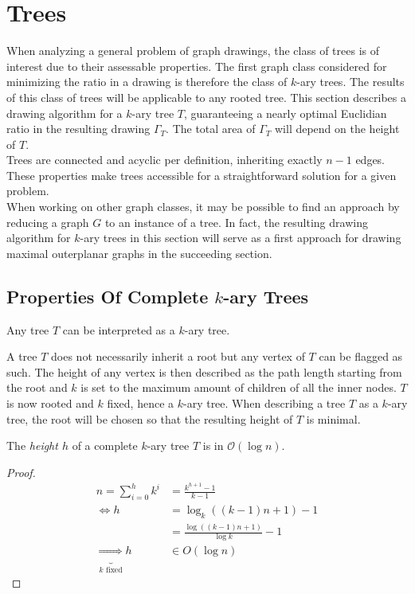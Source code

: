 \section{Trees}\label{s:k-ary_trees}
When analyzing a general problem of graph drawings, the class of trees is of interest due to their assessable properties. The first graph class considered for minimizing the ratio in a drawing is therefore the class of $k$-ary trees. The results of this class of trees will be applicable to any rooted tree. This section describes a drawing algorithm for a $k$-ary tree $T$, guaranteeing a nearly optimal Euclidian ratio in the resulting drawing $\Gamma_T$. The total area of $\Gamma_T$ will depend on the height of $T$.\\
Trees are connected and acyclic per definition, inheriting exactly $n-1$ edges. These properties make trees accessible for a straightforward solution for a given problem.\\
When working on other graph classes, it may be possible to find an approach by reducing a graph $G$ to an instance of a tree. In fact, the resulting drawing algorithm for $k$-ary trees in this section will serve as a first approach for drawing maximal outerplanar graphs in the succeeding section.
\subsection{Properties Of Complete $k$-ary Trees}
\begin{lemma}\label{l:tree_to_k-ary}
	Any tree $T$ can be interpreted as a $k$-ary tree.
\end{lemma}
A tree $T$ does not necessarily inherit a root but any vertex of $T$ can be flagged as such. The height of any vertex is then described as the path length starting from the root and $k$ is set to the maximum amount of children of all the inner nodes. $T$ is now rooted and $k$ fixed, hence a $k$-ary tree. When describing a tree $T$ as a $k$-ary tree, the root will be chosen so that the resulting height of $T$ is minimal.
\begin{lemma}The \emph{height $h$} of a complete $k$-ary tree $T$ is in $\mathcal{O}(\log n)$.\label{l:k-ary-tree_log_height}
\end{lemma}
\begin{proof}
	\begin{align}
		n = \sum_{i=0}^{h}k^i &= \frac{k^{h+1}-1}{k-1}\\
		\Leftrightarrow h &= \log_k((k-1)n+1)-1\\
		&= \frac{\log((k-1)n+1)}{\log k}-1\\
		\underbrace{\Rightarrow}_{k \text{ fixed}}h &\in O(\log n)
	\end{align}
\end{proof}

